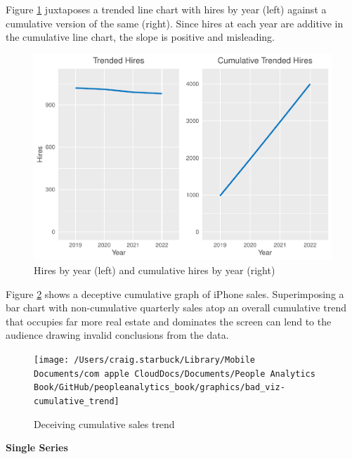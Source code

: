 \documentclass[
]{book}
\begin{document}
Figure \ref{fig:cum-hires-trend} juxtaposes a trended line chart with hires by year (left) against a cumulative version of the same (right). Since hires at each year are additive in the cumulative line chart, the slope is positive and misleading.

\begin{figure}

{\centering \includegraphics[width=1\linewidth]{The_Fundamentals_of_People_Analytics_files/figure-latex/cum-hires-trend-1} 

}

\caption{Hires by year (left) and cumulative hires by year (right)}\label{fig:cum-hires-trend}
\end{figure}

Figure \ref{fig:cum-iphone-sales} shows a deceptive cumulative graph of iPhone sales. Superimposing a bar chart with non-cumulative quarterly sales atop an overall cumulative trend that occupies far more real estate and dominates the screen can lend to the audience drawing invalid conclusions from the data.

\begin{figure}

{\centering \texttt{[image: /Users/craig.starbuck/Library/Mobile Documents/com~apple~CloudDocs/Documents/People Analytics Book/GitHub/peopleanalytics\_book/graphics/bad\_viz-cumulative\_trend]} 

}

\caption{Deceiving cumulative sales trend}\label{fig:cum-iphone-sales}
\end{figure}

\textbf{Single Series}
\end{document}
